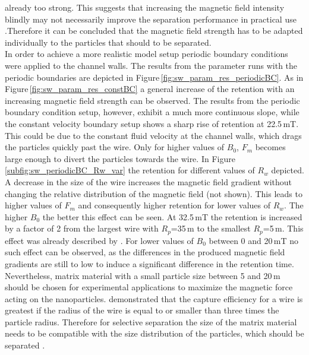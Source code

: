 already too strong. This suggests that increasing the magnetic field intensity blindly may not necessarily improve the separation performance in practical use \cite{ge2017magnetic}.Therefore it can be concluded that the magnetic field strength has to be adapted individually to the particles that should to be separated.\\ 

\FloatBarrier
In order to achieve a more realistic model setup periodic boundary conditions were applied to the channel walls. The results from the parameter runs with the periodic boundaries are depicted in Figure\,\ref{fig:sw_param_res_periodicBC}. As in Figure\,\ref{fig:sw_param_res_constBC} a general increase of the retention with an increasing magnetic field strength can be observed. The results from the periodic boundary condition setup, however, exhibit a much more continuous slope, while the constant velocity boundary setup shows a sharp rise of retention at 22.5\,mT. This could be due to the constant fluid velocity at the channel walls, which drags the particles quickly past the wire. Only for higher values of $B_{0}$, $F_{m}$ becomes large enough to divert the particles towards the wire. In Figure \ref{subfig:sw_periodicBC_Rw_var} the retention for different values of $R_{w}$ depicted. A decrease in the size of the wire increases the magnetic field gradient without changing the relative distribution of the magnetic field (not shown). This leads to higher values of $F_{m}$ and consequently higher retention for lower values of $R_{w}$. The higher $B_{0}$ the better this effect can be seen. At 32.5\,mT the retention is increased by a factor of 2 from the largest wire with $R_{p}$=35\,\textmu m to the smallest $R_{p}$=5\,\textmu m. This effect was already described by \cite{aharoni1976traction}. For lower values of $B_{0}$ between 0 and 20\,mT no such effect can be observed, as the differences in the produced magnetic field gradients are still to low to induce a significant difference in the retention time. Nevertheless, matrix material with a small particle size between 5 and 20\,\textmu m should be chosen for experimental applications to maximize the magnetic force acting on the nanoparticles. \cite{oberteuffer1974magnetic} demonstrated that the capture efficiency for a wire is greatest if the radius of the wire is equal to or smaller than three times the particle radius. Therefore for selective separation the size of the matrix material needs to be compatible with the size distribution of the particles, which should be separated \cite{ge2017magnetic}. \newline
